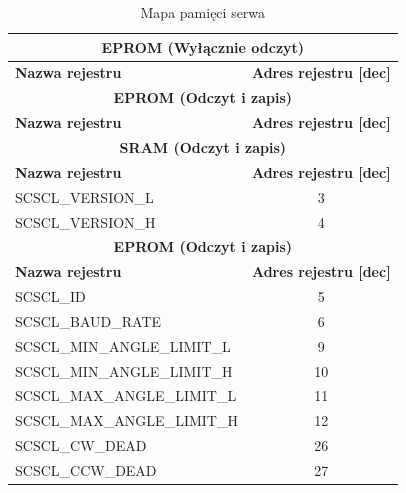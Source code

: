 \begin{center}
    \begin{longtable}[c]{|l|c|}
        \hline
        \multicolumn{2}{|c|}{\textbf{EPROM (Wyłącznie odczyt)}} \\
        \hline
        \textbf{Nazwa rejestru} & \textbf{Adres rejestru [dec]} \\
        \hline
        \endfirsthead
        \hline
        \multicolumn{2}{|c|}{\textbf{EPROM (Odczyt i zapis)}} \\
        \hline
        \textbf{Nazwa rejestru} & \textbf{Adres rejestru [dec]} \\
        \hline
        \endhead
        \hline
        \multicolumn{2}{|c|}{\textbf{SRAM (Odczyt i zapis)}} \\
        \hline
        \textbf{Nazwa rejestru} & \textbf{Adres rejestru [dec]} \\
        \hline
        \endhead
        \hline
        \caption{\label{tab: servo_memory_map} Mapa pamięci serwa}
        \endfoot
        
        \hline
        SCSCL\_VERSION\_L & 3 \\
        \hline
        SCSCL\_VERSION\_H & 4 \\
        \hline
        
        \multicolumn{2}{|c|}{\textbf{EPROM (Odczyt i zapis)}} \\
        \hline
        \textbf{Nazwa rejestru} & \textbf{Adres rejestru [dec]} \\
        \hline
        SCSCL\_ID & 5 \\
        \hline
        SCSCL\_BAUD\_RATE & 6 \\
        \hline
        SCSCL\_MIN\_ANGLE\_LIMIT\_L & 9 \\
        \hline
        SCSCL\_MIN\_ANGLE\_LIMIT\_H & 10 \\
        \hline
        SCSCL\_MAX\_ANGLE\_LIMIT\_L & 11 \\
        \hline
        SCSCL\_MAX\_ANGLE\_LIMIT\_H & 12 \\
        \hline
        SCSCL\_CW\_DEAD & 26 \\
        \hline
        SCSCL\_CCW\_DEAD & 27 \\
        \hline


\end{longtable}
\end{center}
